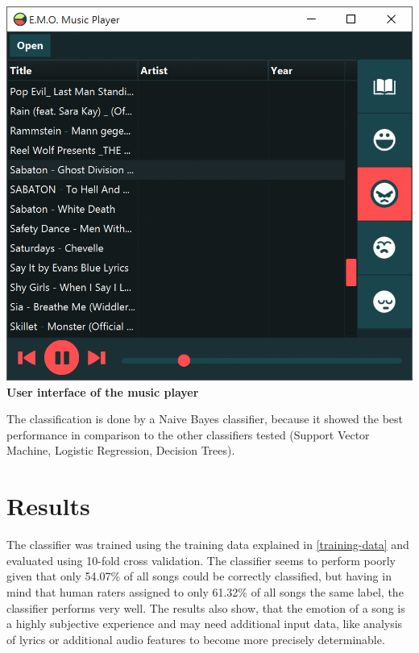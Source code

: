 \begin{multicols}{2}
\begin{Figure}
	\label{screenshot}
	\includegraphics[width=\linewidth]{images/screenshot.png}
	\centering
	\textbf{User interface of the music player}
\end{Figure}
\vspace*{5pt}

The classification is done by a Naive Bayes classifier, because it showed the best performance in comparison to the other classifiers tested (Support Vector Machine, Logistic Regression, Decision Trees).

\section{Results}
The classifier was trained using the training data explained in \ref{training-data} and evaluated using 10-fold cross validation. The classifier seems to perform poorly given that only 54.07\% of all songs could be correctly classified, but having in mind that human raters assigned to only 61.32\% of all songs the same label, the classifier performs very well. The results also show, that the emotion of a song is a highly subjective experience and may need additional input data, like analysis of lyrics or additional audio features to become more precisely determinable.


\end{multicols}
